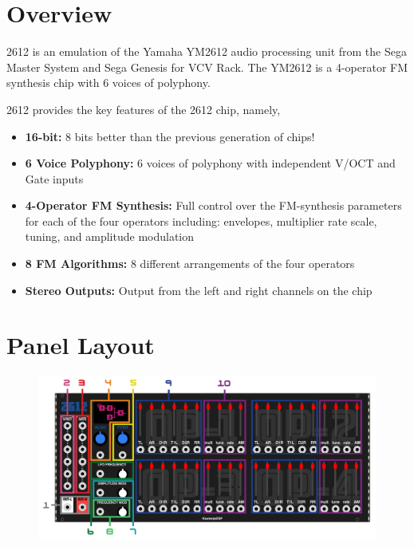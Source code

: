 \documentclass[12pt,a4paper]{article}
\begin{document}


\section{Overview}

2612 is an emulation of the Yamaha YM2612 audio processing unit from the Sega Master System and Sega Genesis for VCV Rack. The YM2612 is a 4-operator FM synthesis chip with 6 voices of polyphony.

2612 provides the key features of the 2612 chip, namely,
\begin{itemize}
  \item \textbf{16-bit:} 8 bits better than the previous generation of chips!
  \item \textbf{6 Voice Polyphony:} 6 voices of polyphony with independent V/OCT and Gate inputs
  \item \textbf{4-Operator FM Synthesis:} Full control over the FM-synthesis parameters for each of the four operators including: envelopes, multiplier rate scale, tuning, and amplitude modulation
  \item \textbf{8 FM Algorithms:} 8 different arrangements of the four operators
  \item \textbf{Stereo Outputs:} Output from the left and right channels on the chip
\end{itemize}


\clearpage
\section{Panel Layout}

\begin{figure}[!htp]
\centering
\includegraphics[width=\maxwidth{\textwidth}]{2612-Manual}
\end{figure}
\end{document}
